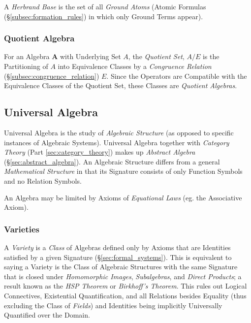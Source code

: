 \documentclass{article}
\begin{document}
A \emph{Herbrand Base} is the set of all \emph{Ground Atoms} (Atomic
Formulas (\S\ref{subsec:formation_rules}) in which only Ground Terms
appear).

\subsubsection{Quotient Algebra}\label{subsec:quotient_algebra}

For an Algebra $\mathbf{A}$ with Underlying Set $A$, the
\emph{Quotient Set}, $A / E$ is the Partitioning of $A$ into
Equivalence Classes by a \emph{Congruence Relation}
(\S\ref{subsec:congruence_relation}) $E$. Since the Operators are
Compatible with the Equivalence Classes of the Quotient Set, these
Classes are \emph{Quotient Algebras}.

\subsection{Universal Algebra}\label{subsec:universal_algebra}

Universal Algebra is the study of \emph{Algebraic Structure} (as
opposed to specific instances of Algebraic Systems). Universal Algebra
together with \emph{Category Theory} (Part \ref{sec:category_theory})
makes up \emph{Abstract Algebra} (\S\ref{sec:abstract_algebra}). An
Algebraic Structure differs from a general \emph{Mathematical
  Structure} in that its Signature consists of only Function Symbols
and no Relation Symbols.

An Algebra may be limited by Axioms of \emph{Equational Laws} (eg. the
Associative Axiom).

\subsubsection{Varieties}

A \emph{Variety} is a \emph{Class} of Algebras defined only by Axioms
that are Identities satisfied by a given Signature
(\S\ref{sec:formal_systems}). This is equivalent to saying a Variety
is the Class of Algebraic Structures with the same Signature that is
closed under \emph{Homomorphic Images}, \emph{Subalgebras}, and
\emph{Direct Products}; a result known as the \emph{HSP Theorem} or
\emph{Birkhoff's Theorem}\cite{birkhoff35}. This rules out Logical
Connectives, Existential Quantification, and all Relations besides
Equality (thus excluding the Class of \emph{Fields}) and Identities
being implicitly Universally Quantified over the Domain.
\end{document}
